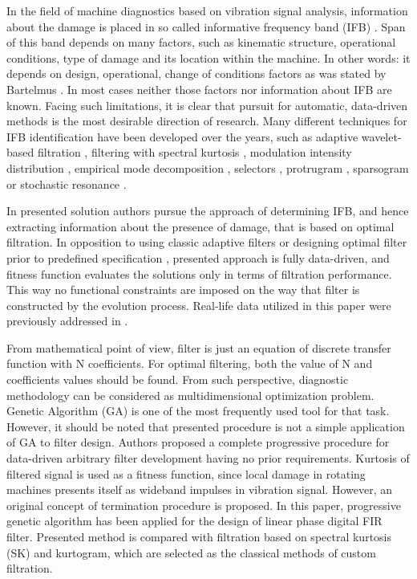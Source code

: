 \documentclass[preprint,12pt]{elsarticle}
\begin{document}
In the field of machine diagnostics based on vibration signal analysis, information about the damage is placed in so called informative frequency band (IFB) \cite{obuchowski2014selection}. Span of this band depends on many factors, such as kinematic structure, operational conditions, type of damage and its location within the machine. In other words: it depends on design, operational, change of conditions factors as was stated by Bartelmus \cite{bartelmus2009new}. In most cases neither those factors nor information about IFB are known. Facing such limitations, it is clear that pursuit for automatic, data-driven methods is the most desirable direction of research. Many different techniques for IFB identification have been developed over the years, such as adaptive wavelet-based filtration \cite{nikolaou2002demodulation,peter2004machine}, filtering with spectral kurtosis \cite{antoni2009cyclostationarity,antoni2006spectral}, modulation intensity distribution \cite{urbanek2012detection}, empirical mode decomposition \cite{flandrin2004empirical,liu2006gearbox,lei2013review}, selectors \cite{obuchowski2014recent,wylomanska2016impulsive,zak20161932}, protrugram \cite{barszcz2011novel}, sparsogram \cite{peter2013design,peter2013automatic} or stochastic resonance \cite{lei2013planetary}.

In presented solution authors pursue the approach of determining IFB, and hence extracting information about the presence of damage, that is based on optimal filtration. In opposition to using classic adaptive filters \cite{makowski2014new,makowski2013procedure} or designing optimal filter prior to predefined specification \cite{nilsson2003digital}, presented approach is fully data-driven, and fitness function evaluates the solutions only in terms of filtration performance. This way no functional constraints are imposed on the way that filter is constructed by the evolution process. Real-life data utilized in this paper were previously addressed in \cite{wodecki2017local}.

From mathematical point of view, filter is just an equation of discrete transfer function with N coefficients. For optimal filtering, both the value of N and coefficients values should be found. From such perspective, diagnostic methodology can be considered as multidimensional optimization problem. Genetic Algorithm (GA) is one of the most frequently used tool for that task. However, it should be noted that presented procedure is not a simple application of GA to filter design. Authors proposed a complete progressive procedure for data-driven arbitrary filter development having no prior requirements. Kurtosis of filtered signal is used as a fitness function, since local damage in rotating machines presents itself as wideband impulses in vibration signal. However, an original concept of termination procedure is proposed. In this paper, progressive genetic algorithm has been applied for the design of linear phase digital FIR filter. Presented method is compared with filtration based on spectral kurtosis (SK) and kurtogram, which are selected as the classical methods of custom filtration.
\end{document}
